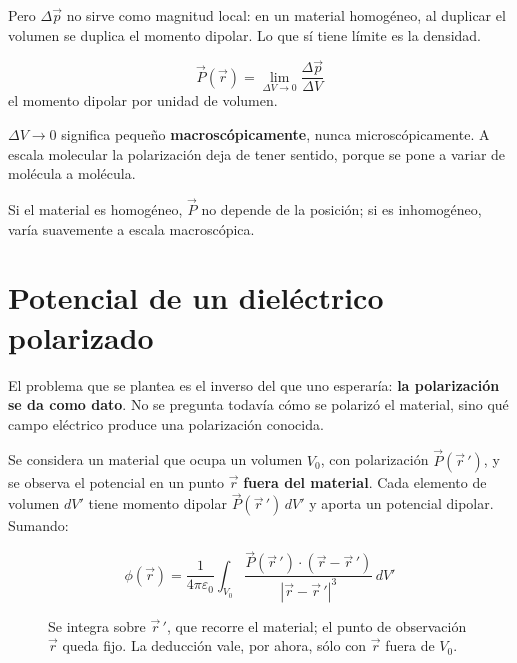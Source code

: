 \documentclass[12pt,a4paper]{article}
\begin{document}
Pero $\Delta\vec p$ no sirve como magnitud local: en un material homogéneo, al
duplicar el volumen se duplica el momento dipolar. Lo que sí tiene límite es la
densidad.

\begin{keybox}
\[
\boxed{\ \vec P(\vec r) = \lim_{\Delta V \to 0} \frac{\Delta \vec p}{\Delta V}\ }
\]
el momento dipolar por unidad de volumen.
\end{keybox}

\begin{warnbox}
$\Delta V \to 0$ significa pequeño \textbf{macroscópicamente}, nunca
microscópicamente. A escala molecular la polarización deja de tener sentido,
porque se pone a variar de molécula a molécula.
\end{warnbox}

Si el material es homogéneo, $\vec P$ no depende de la posición; si es
inhomogéneo, varía suavemente a escala macroscópica.

\section{Potencial de un dieléctrico polarizado}

El problema que se plantea es el inverso del que uno esperaría: \textbf{la
polarización se da como dato}. No se pregunta todavía cómo se polarizó el
material, sino qué campo eléctrico produce una polarización conocida.

Se considera un material que ocupa un volumen $V_0$, con polarización
$\vec P(\vec r\,')$, y se observa el potencial en un punto $\vec r$ \textbf{fuera
del material}. Cada elemento de volumen $dV'$ tiene momento dipolar
$\vec P(\vec r\,')\,dV'$ y aporta un potencial dipolar. Sumando:

\begin{keybox}
\[
\boxed{\ \phi(\vec r) = \frac{1}{4\pi\varepsilon_0}
\int_{V_0} \frac{\vec P(\vec r\,') \cdot (\vec r - \vec r\,')}
{|\vec r - \vec r\,'|^3}\, dV' \ }
\]
\end{keybox}

\begin{figure}[H]
  \centering
  
  \caption{Se integra sobre $\vec r\,'$, que recorre el material; el punto de
  observación $\vec r$ queda fijo. La deducción vale, por ahora, sólo con
  $\vec r$ fuera de $V_0$.}
\end{figure}
\end{document}
